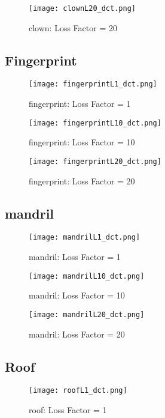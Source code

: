 \documentclass{article} %
\begin{document}
\begin{figure}[H]
\centering
\texttt{[image: clownL20\_dct.png]}
\caption{clown: Loss Factor = 20}
\end{figure}

\subsection{Fingerprint}
\begin{figure}[H]
\centering
\texttt{[image: fingerprintL1\_dct.png]}
\caption{fingerprint: Loss Factor = 1}
\end{figure}

\begin{figure}[H]
\centering
\texttt{[image: fingerprintL10\_dct.png]}
\caption{fingerprint: Loss Factor = 10}
\end{figure}

\begin{figure}[H]
\centering
\texttt{[image: fingerprintL20\_dct.png]}
\caption{fingerprint: Loss Factor = 20}
\end{figure}

\subsection{mandril}
\begin{figure}[H]
\centering
\texttt{[image: mandrilL1\_dct.png]}
\caption{mandril: Loss Factor = 1}
\end{figure}

\begin{figure}[H]
\centering
\texttt{[image: mandrilL10\_dct.png]}
\caption{mandril: Loss Factor = 10}
\end{figure}

\begin{figure}[H]
\centering
\texttt{[image: mandrilL20\_dct.png]}
\caption{mandril: Loss Factor = 20}
\end{figure}

\subsection{Roof}
\begin{figure}[H]
\centering
\texttt{[image: roofL1\_dct.png]}
\caption{roof: Loss Factor = 1}
\end{figure}
\end{document}
